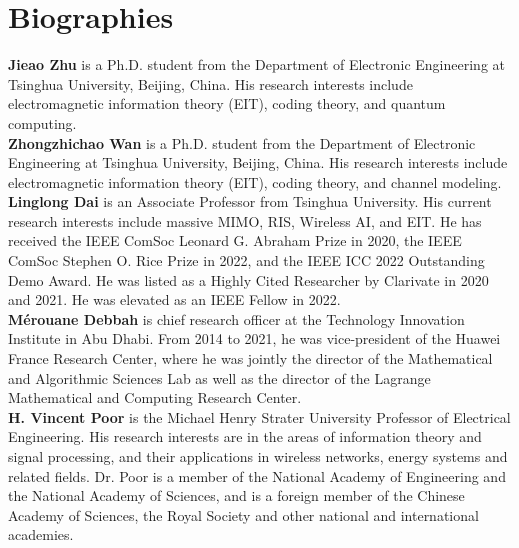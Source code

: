 \documentclass[journal,twocolumn]{IEEEtran}
\begin{document}
\normalsize
\vspace{-1em}
\section*{Biographies}

{\bf Jieao Zhu} is a Ph.D. student from the Department of Electronic Engineering at Tsinghua University, Beijing, China. His research interests include electromagnetic information theory (EIT), coding theory, and quantum computing. 
\\

{\bf Zhongzhichao Wan} is a Ph.D. student from the Department of Electronic Engineering at Tsinghua University, Beijing, China. His research interests include electromagnetic information theory (EIT), coding theory, and channel modeling. 
\\


{\bf Linglong Dai} is an Associate Professor from Tsinghua University. His current research interests include massive MIMO, RIS, Wireless AI, and EIT. He has received the IEEE ComSoc Leonard G. Abraham Prize in 2020, the IEEE ComSoc Stephen O. Rice Prize in 2022, and the IEEE ICC 2022 Outstanding Demo Award. He was listed as a Highly Cited Researcher by Clarivate in 2020 and 2021. He was elevated as an IEEE Fellow in 2022.
\\

{\bf M\'{e}rouane Debbah} is chief research officer at the Technology Innovation Institute in Abu Dhabi. From 2014 to 2021, he was vice-president of the Huawei France Research Center, where he was jointly the director of the Mathematical and Algorithmic Sciences Lab as well as the director of the Lagrange Mathematical and Computing Research Center. 
\\

{\bf H. Vincent Poor} is the Michael Henry Strater University Professor of Electrical Engineering. His research interests are in the areas of information theory and signal processing, and their applications in wireless networks, energy systems and related fields. Dr. Poor is a member of the National Academy of Engineering and the National Academy of Sciences, and is a foreign member of the Chinese Academy of Sciences, the Royal Society and other national and international academies. 
\\
\end{document}
